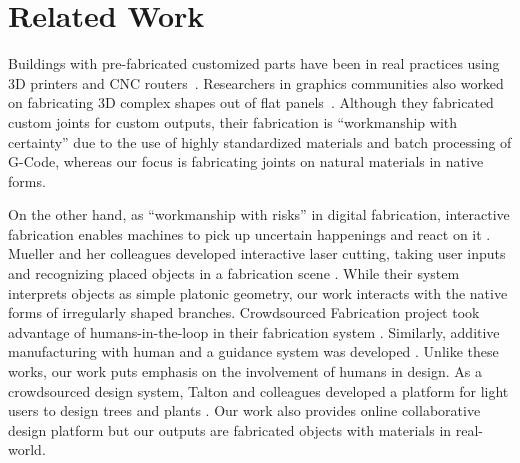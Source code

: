 \section{Related Work}
Buildings with pre-fabricated customized parts have been in real practices using 3D printers and CNC routers~\cite{knaack2012prefabricated}.
Researchers in graphics communities also worked on fabricating 3D complex shapes out of flat panels~\cite{schwartzburg2013fabrication,cignoni2014field,fu2015computational}.
Although they fabricated custom joints for custom outputs, their fabrication is ``workmanship with certainty'' due to the use of highly standardized materials and batch processing of G-Code, whereas our focus is fabricating joints on natural materials in native forms.

On the other hand, as ``workmanship with risks'' in digital fabrication, interactive fabrication enables machines to pick up uncertain happenings and react on it \cite{willis2011interactive}.
Mueller and her colleagues developed interactive laser cutting, taking user inputs and recognizing placed objects in a fabrication scene \cite{Mueller:2012:ICI:2380116.2380191}.
While their system interprets objects as simple platonic geometry, our work interacts with the native forms of irregularly shaped branches.
Crowdsourced Fabrication project took advantage of humans-in-the-loop in their fabrication system \cite{lafreniere2016crowdsourced}.
Similarly, additive manufacturing with human and a guidance system was developed \cite{Yoshida:2015:AHA:2809654.2766951}.
Unlike these works, our work puts emphasis on the involvement of humans in design.
As a crowdsourced design system, Talton and colleagues developed a platform for light users to design trees and plants \cite{talton2009exploratory}.
Our work also provides online collaborative design platform but our outputs are fabricated objects with materials in real-world.

